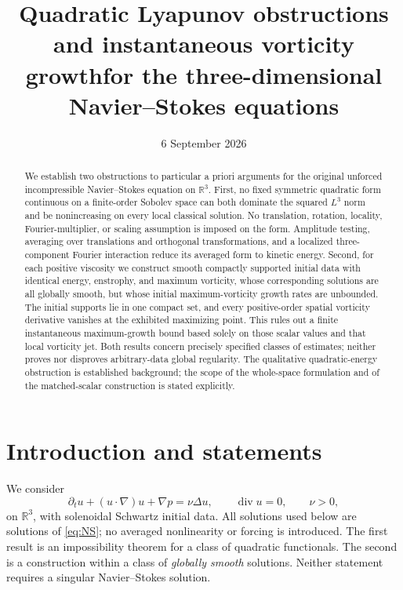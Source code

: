 \documentclass[11pt]{article}
\title{Quadratic Lyapunov obstructions and instantaneous vorticity growth\newline for the three-dimensional Navier--Stokes equations}
\author{}
\date{6 September 2026}
\theoremstyle{remark}
\newcommand{\R}{\mathbb R}
\newcommand{\diver}{\operatorname{div}}
\begin{document}
\maketitle
\begin{abstract}
We establish two obstructions to particular a priori arguments for the
original unforced incompressible Navier--Stokes equation on $\R^3$.
First, no fixed symmetric quadratic form continuous on a finite-order
Sobolev space can both dominate the squared $L^3$ norm and be nonincreasing
on every local classical solution. No translation, rotation, locality,
Fourier-multiplier, or scaling assumption is imposed on the form. Amplitude
testing, averaging over translations and orthogonal transformations, and a
localized three-component Fourier interaction reduce its averaged form to
kinetic energy. Second, for each positive viscosity we construct smooth
compactly supported initial data with identical energy, enstrophy, and
maximum vorticity, whose corresponding solutions are all globally smooth,
but whose initial maximum-vorticity growth rates are unbounded. The initial
supports lie in one compact set, and every positive-order spatial vorticity
derivative vanishes at the exhibited maximizing point. This rules out a
finite instantaneous maximum-growth bound based solely on those scalar
values and that local vorticity jet. Both results concern precisely specified
classes of estimates; neither proves nor disproves arbitrary-data global
regularity. The qualitative quadratic-energy obstruction is established
background; the scope of the whole-space formulation and of the matched-scalar
construction is stated explicitly.
\end{abstract}

\section{Introduction and statements}
\label{sec:introduction}
We consider
\begin{equation}
 \partial_tu+(u\cdot\nabla)u+\nabla p=\nu\Delta u,
 \qquad \diver u=0,\qquad \nu>0,
 \label{eq:NS}
\end{equation}
on $\R^3$, with solenoidal Schwartz initial data. All solutions used below
are solutions of \eqref{eq:NS}; no averaged nonlinearity or forcing is
introduced. The first result is an impossibility theorem for a class of
quadratic functionals. The second is a construction within a class of
\emph{globally smooth} solutions. Neither statement requires a singular
Navier--Stokes solution.
\end{document}
